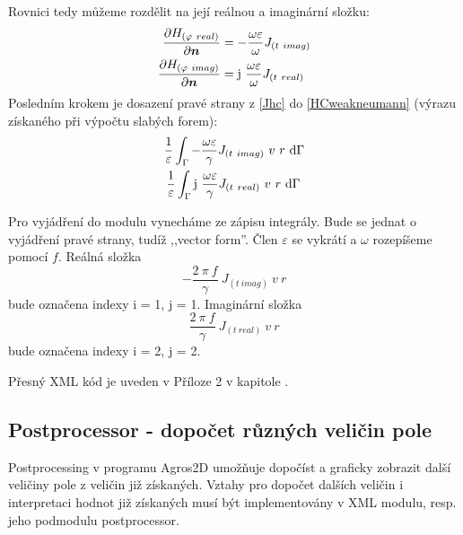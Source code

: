 \documentclass[12pt,a4paper,oneside]{article}
\numberwithin{equation}{section} %
\numberwithin{figure}{section} %
\numberwithin{table}{section} %
\newcommand{\mj}{\mathrm{j}} %
\renewcommand{\vec}[1]{\mbox{\boldmath$#1$}} %
\begin{document}
Rovnici tedy můžeme rozdělit na její reálnou a imaginární složku:
\begin{subequations}
\label{Jhc}
\begin{align}
\frac{\partial H _{(\varphi ~real)}}{\partial \vec{n}} &= - \frac{\omega \varepsilon}{\omega}  J _{(t~imag)}
\\
\frac{\partial H _{(\varphi ~imag)}}{\partial \vec{n}} &= \mj ~ \frac{\omega \varepsilon}{\omega} J _{(t~real)}
\end{align}
\end{subequations}
Posledním krokem je dosazení pravé strany z \ref{Jhc} do \ref{HCweakneumann} (výrazu získaného při výpočtu slabých forem):
\begin{subequations}
\begin{align}
\frac{1}{\varepsilon} \int _{\Gamma} - \frac{\omega \varepsilon}{\gamma} J _{(t~imag)} ~ v ~ r ~ \ud \Gamma
\\
\frac{1}{\varepsilon} \int _{\Gamma} \mj ~ \frac{\omega \varepsilon}{\gamma} J _{(t~real)} ~ v ~ r ~ \ud \Gamma ~
\end{align}
\end{subequations}

Pro vyjádření do modulu vynecháme ze zápisu integrály. Bude se jednat o vyjádření pravé strany, tudíž ,,vector form''. Člen $\varepsilon$ se vykrátí a $\omega$ rozepíšeme pomocí $f$. Reálná složka  
\begin{equation}
- \frac{2 ~ \pi ~ f}{\gamma} ~ J_{(t~imag)} ~ v ~ r
\end{equation} 
bude označena indexy i = 1, j = 1. Imaginární složka 
\begin{equation}
\frac{2 ~ \pi ~ f}{\gamma} ~ J_{(t~real)} ~ v ~ r
\end{equation}
bude označena indexy i = 2, j = 2.

Přesný XML kód je uveden v Příloze 2 v kapitole .




\subsection{Postprocessor - dopočet různých veličin pole}
Postprocessing v programu Agros2D umožňuje dopočíst a graficky zobrazit další veličiny pole z veličin již získaných. Vztahy pro dopočet dalších veličin i interpretaci hodnot již získaných musí být implementovány v XML modulu, resp. jeho podmodulu postprocessor.
\end{document}
